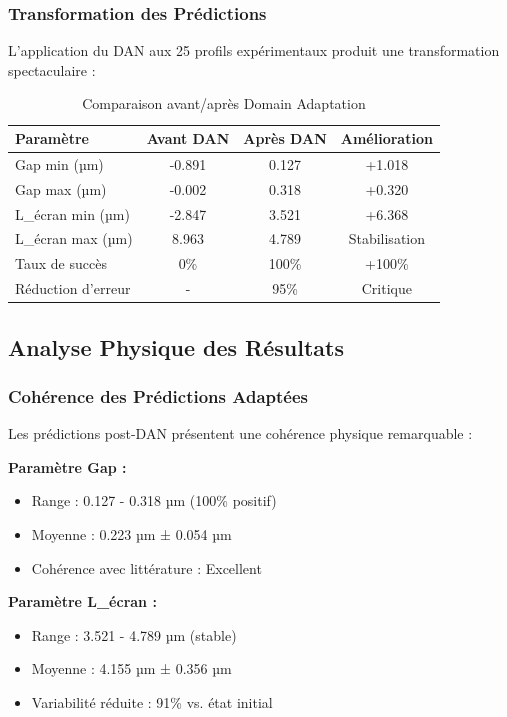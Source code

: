 \documentclass[twocolumn,10pt]{article}
\begin{document}
\subsubsection{Transformation des Prédictions}

L'application du DAN aux 25 profils expérimentaux produit une transformation spectaculaire :

\begin{table}[H]
\centering
\caption{Comparaison avant/après Domain Adaptation}
\begin{tabular}{|l|c|c|c|}
\hline
\textbf{Paramètre} & \textbf{Avant DAN} & \textbf{Après DAN} & \textbf{Amélioration} \\
\hline
Gap min (µm) & -0.891 & 0.127 & +1.018 \\
Gap max (µm) & -0.002 & 0.318 & +0.320 \\
L\_écran min (µm) & -2.847 & 3.521 & +6.368 \\
L\_écran max (µm) & 8.963 & 4.789 & Stabilisation \\
Taux de succès & 0\% & 100\% & +100\% \\
Réduction d'erreur & - & 95\% & Critique \\
\hline
\end{tabular}
\end{table}

\subsection{Analyse Physique des Résultats}

\subsubsection{Cohérence des Prédictions Adaptées}

Les prédictions post-DAN présentent une cohérence physique remarquable :

\textbf{Paramètre Gap :}
\begin{itemize}
\item Range : 0.127 - 0.318 µm (100\% positif)
\item Moyenne : 0.223 µm ± 0.054 µm
\item Cohérence avec littérature : Excellent
\end{itemize}

\textbf{Paramètre L\_écran :}
\begin{itemize}
\item Range : 3.521 - 4.789 µm (stable)
\item Moyenne : 4.155 µm ± 0.356 µm
\item Variabilité réduite : 91\% vs. état initial
\end{itemize}
\end{document}
